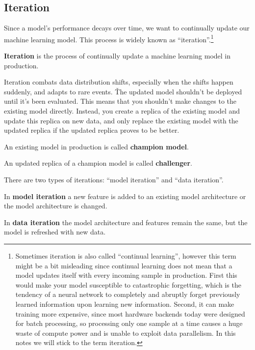 \subsection{Iteration}

Since a model's performance decays over time, we want to continually update our machine learning model. This process
is widely known as ``iteration''.\footnote{Sometimes iteration is also called ``continual learning'', however this
term might be a bit misleading since continual learning does not mean that a model updates itself with every incoming
sample in production. First this would make your model susceptible to catastrophic forgetting, which is the tendency
of a neural network to completely and abruptly forget previously learned information upon learning new information.
Second, it can make training more expensive, since most hardware backends today were designed for batch processing,
so processing only one sample at a time causes a huge waste of compute power and is unable to exploit data
parallelism. In this notes we will stick to the term iteration.}

\bd[Iteration]
\textbf{Iteration} is the process of continually update a machine learning model in production.
\ed

Iteration combats data distribution shifts, especially when the shifts happen suddenly, and adapts to rare events. \v

The updated model shouldn't be deployed until it's been evaluated. This means that you shouldn't make changes to the
existing model directly. Instead, you create a replica of the existing model and update this replica on new data, and
only replace the existing model with the updated replica if the updated replica proves to be better.

An existing model in production is called \textbf{champion model}.
\ed

An updated replica of a champion model is called \textbf{challenger}.
\ed


There are two types of iterations: ``model iteration'' and ``data iteration''.

In \textbf{model iteration} a new feature is added to an existing model architecture or the model architecture is
changed.
\ed

In \textbf{data iteration} the model architecture and features remain the same, but the model is refreshed with new
data.
\ed

